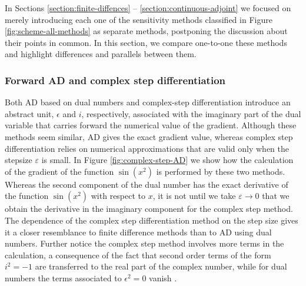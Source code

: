 In Sections \ref{section:finite-diffences} -- \ref{section:continuous-adjoint} we focused on merely introducing each one of the sensitivity methods classified in Figure \ref{fig:scheme-all-methods} as separate methods, postponing the discussion about their points in common. 
In this section, we compare one-to-one these methods and highlight differences and parallels between them. 


\subsubsection{Forward AD and complex step differentiation}

Both AD based on dual numbers and complex-step differentiation introduce an abstract unit, $\epsilon$ and $i$, respectively, associated with the imaginary part of the dual variable that carries forward the numerical value of the gradient.
Although these methods seem similar, AD gives the exact gradient value, whereas complex step differentiation relies on numerical approximations that are valid only when the stepsize $\varepsilon$ is small. 
In Figure \ref{fig:complex-step-AD} we show how the calculation of the gradient of the function $\sin (x^2)$ is performed by these two methods.
Whereas the second component of the dual number has the exact derivative of the function $\sin(x^2)$ with respect to $x$, it is not until we take $\varepsilon \rightarrow 0$ that we obtain the derivative in the imaginary component for the complex step method.
The dependence of the complex step differentiation method on the step size gives it a closer resemblance to finite difference methods than to AD using dual numbers.
Further notice the complex step method involves more terms in the calculation, a consequence of the fact that second order terms of the form $i^2 = -1$ are transferred to the real part of the complex number, while for dual numbers the terms associated to $\epsilon^2 = 0$ vanish \cite{martins2001connection}. 

